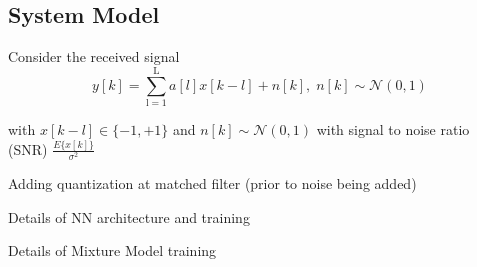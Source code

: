 \documentclass[12pt,a4paper]{report}
\begin{document}
\subsection{System Model}
Consider the received signal 
\begin{equation}
y[k] = \sum_{\mathrm{l=1}}^{\mathrm{L}} a[l]x[k-l] + n[k], \; n[k]  \sim \mathcal{N}(0,1)
\end{equation}

with $x[k-l] \in \{ -1, +1\}$ and $n[k]  \sim \mathcal{N}(0,1)$
with signal to noise ratio (SNR) 
$\frac{E\{x[k]\}}{\sigma^2}$




Adding quantization at matched filter (prior to noise being added)


Details of NN architecture and training

Details of Mixture Model training
\end{document}
